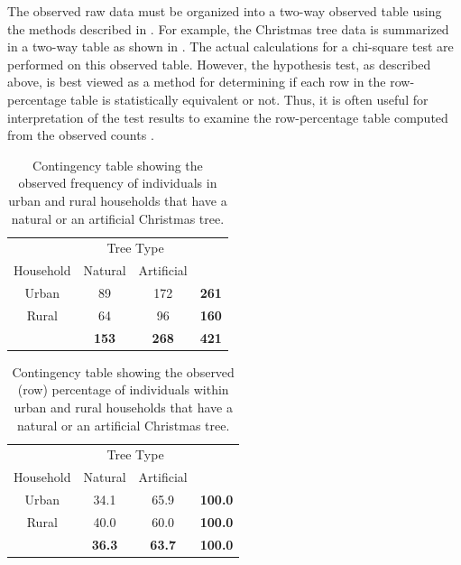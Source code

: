 \documentclass[10pt,openany]{book}\usepackage[]{graphicx}\usepackage[]{color}
\begin{document}

The observed raw data must be organized into a two-way observed table using the methods described in .  For example, the Christmas tree data is summarized in a two-way table as shown in .  The actual calculations for a chi-square test are performed on this observed table.  However, the hypothesis test, as described above, is best viewed as a method for determining if each row in the row-percentage table is statistically equivalent or not.  Thus, it is often useful for interpretation of the test results to examine the row-percentage table computed from the observed counts .

\begin{table}[htbp]
  \centering
  \caption{Contingency table showing the observed frequency of individuals in urban and rural households that have a natural or an artificial Christmas tree.}\label{tab:ChiTreeObs}
    \begin{tabular}{c|c|c|c|}
      \multicolumn{1}{c}{} & \multicolumn{2}{c}{Tree Type} & \multicolumn{1}{c}{} \\
      \cline{2-3}
      Household & Natural & Artificial & \multicolumn{1}{c}{} \\
      \hline
      \multicolumn{1}{|c|}{Urban} & 89 & 172 & \textbf{261} \\
      \hline
      \multicolumn{1}{|c|}{Rural} & 64 & 96 & \textbf{160} \\
      \hline
       & \textbf{153} & \textbf{268} & \textbf{421} \\
      \cline{2-4}
    \end{tabular}
\end{table}

\begin{table}[htbp]
  \centering
  \caption{Contingency table showing the observed (row) percentage of individuals within urban and rural households that have a natural or an artificial Christmas tree.}\label{tab:ChiTreeObsProp}
    \begin{tabular}{c|c|c|c|}
      \multicolumn{1}{c}{} & \multicolumn{2}{c}{Tree Type} & \multicolumn{1}{c}{} \\
      \cline{2-3}
      Household & Natural & Artificial & \multicolumn{1}{c}{} \\
      \hline
      \multicolumn{1}{|c|}{Urban} & 34.1 & 65.9 & \textbf{100.0} \\
      \hline
      \multicolumn{1}{|c|}{Rural} & 40.0 & 60.0 & \textbf{100.0} \\
      \hline
       & \textbf{36.3} & \textbf{63.7} & \textbf{100.0} \\
      \cline{2-4}
    \end{tabular}
\end{table}
\end{document}
